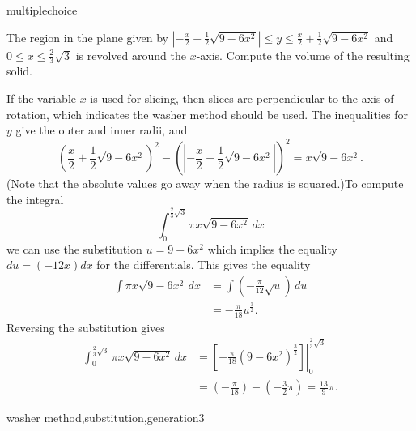 \documentclass{ximera}
\begin{document}
\begin{question}[washersqrtsub001]
\begin{type}
multiplechoice
\end{type}
The region in the plane given by \(\left|{- \frac{x}{2} + \frac{1}{2} \sqrt{9 - 6 x^{2}}}\right| \leq y \leq \frac{x}{2} + \frac{1}{2} \sqrt{9 - 6 x^{2}}\) and \(0 \leq x \leq \frac{2}{3} \sqrt{3}\) is revolved around the \(x\)-axis. Compute the volume of the resulting solid.
\begin{multiplechoice}
\end{multiplechoice}
\begin{feedback}
If the variable \(x\) is used for slicing, then slices are perpendicular to the axis of rotation, which indicates the washer method should be used.
The inequalities for \(y\) give the outer and inner radii, and \[ \left(\frac{x}{2} + \frac{1}{2} \sqrt{9 - 6 x^{2}}\right)^2 - \left( \left|{- \frac{x}{2} + \frac{1}{2} \sqrt{9 - 6 x^{2}}}\right|\right)^2 = x \sqrt{9 - 6 x^{2}}. \](Note that the absolute values go away when the radius is squared.)To compute the integral 
\[ \int_{0}^{\frac{2}{3} \sqrt{3}} \pi x \sqrt{9 - 6 x^{2}}\, dx \]
 we can use the substitution \(u = 9 - 6 x^{2}\) which implies the equality \(du = \left(- 12 x\right)dx\) for the differentials. This gives the equality
\[ \begin{aligned} \int \pi x \sqrt{9 - 6 x^{2}}\, dx & = \int \left(- \frac{\pi}{12} \sqrt{u}\right)\, du \\
 & = - \frac{\pi}{18} u^{\frac{3}{2}}. \end{aligned} \]
Reversing the substitution gives
\[ \begin{aligned} \int_{0}^{\frac{2}{3} \sqrt{3}} \pi x \sqrt{9 - 6 x^{2}}\, dx & = \left. \left[- \frac{\pi}{18} \left(9 - 6 x^{2}\right)^{\frac{3}{2}} \right] \right|_{0}^{\frac{2}{3} \sqrt{3}}\\ & = \left(- \frac{\pi}{18} \right) - \left(- \frac{3}{2} \pi \right) = \frac{13}{9} \pi. \end{aligned} \]
\end{feedback}
\begin{keywords}
washer method,substitution,generation3
\end{keywords}
\end{question}
\end{document}
